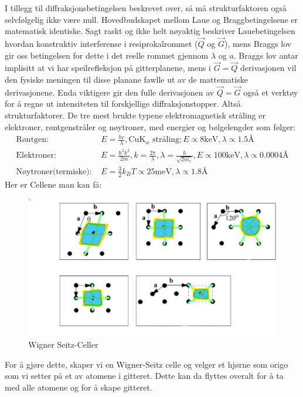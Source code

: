\documentclass{article}
\begin{document}
I tillegg til diffraksjonsbetingelsen beskrevet over, så må strukturfaktoren også selvfølgelig ikke være null.
Hovedbudskapet mellom Laue og Braggbetingelsene er matematisk identiske. Sagt raskt og ikke helt nøyaktig beskriver Lauebetingelsen hvordan konstruktiv interferense i resiprokalrommet ($\vec{Q}$ og $\vec{G}$), mens Braggs lov gir oss betingelsen for dette i det reelle rommet gjennom $\lambda$ og $a$. Braggs lov antar implisitt at vi har speilrefleksjon på gitterplanene, mens i $\vec{G} = \vec{Q}$ derivasjonen vil den fysiske meningen til disse planane fawlle ut av de mattematiske derivasjonene. Enda viktigere gir den fulle derivasjonen av $\vec{Q} = \vec{G}$ også et verktøy for å regne ut intensiteten til forskjellige diffraksjonstopper. Altså strukturfaktorer.
De tre mest brukte typene elektromagnetisk stråling er elektroner, røntgenstråler og nøytroner, med energier og bølgelengder som følger:
\begin{align}
    \text{Røntgen: }& E = \frac{hc}{\lambda}, \text{CuK}_{\alpha} \text{ stråling}; E \propto 8 \text{keV}, \lambda \propto 1.5Å \\
    \text{Elektroner: }& E = \frac{\hbar^2k^2}{2m}, k=\frac{2\pi}{\lambda}, \lambda = \frac{h}{\sqrt{2m_e}}, E \propto 100 \text{keV}, \lambda \propto 0.0004Å \\
    \text{Nøytroner(termiske): }& E = \frac{3}{2} k_B T \propto 25 \text{meV}, \lambda \propto 1.8Å
\end{align}
Her er Cellene man kan få:
\begin{figure}[H]
    \centering
    \includegraphics[width=0.85\linewidth]{bilder_lf/wigner_seitz_celler.png}
    \caption{Wigner Seitz-Celler}
    \label{fig:wigner_seitz_celler}
\end{figure}
For å gjøre dette, skaper vi en Wigner-Seitz celle og velger et hjørne som origo som vi setter på et av atomene i gitteret. Dette kan da flyttes overalt for å ta med alle atomene og for å skape gitteret.
\end{document}
